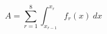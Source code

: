 \documentclass{article}
\begin{document}
    \begin{equation}
       A = \sum_{r=1}^8 \int_{x_{r-1}}^{x_r} f_r(x)\ {dx}
    \end{equation}


\end{document}
